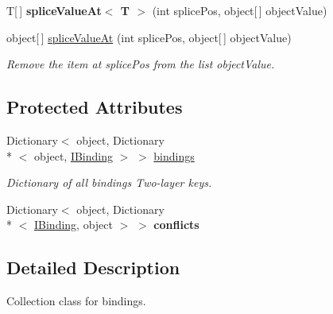 \begin{DoxyCompactItemize}
\item 
\hypertarget{classstrange_1_1framework_1_1impl_1_1_binder_a1550cafde3f21467d63dae64e1078fb0}{T\mbox{[}$\,$\mbox{]} {\bfseries splice\-Value\-At$<$ T $>$} (int splice\-Pos, object\mbox{[}$\,$\mbox{]} object\-Value)}\label{classstrange_1_1framework_1_1impl_1_1_binder_a1550cafde3f21467d63dae64e1078fb0}

\item 
\hypertarget{classstrange_1_1framework_1_1impl_1_1_binder_a349b12bdc879e7f465a7cf7dfeb3b5b4}{object\mbox{[}$\,$\mbox{]} \hyperlink{classstrange_1_1framework_1_1impl_1_1_binder_a349b12bdc879e7f465a7cf7dfeb3b5b4}{splice\-Value\-At} (int splice\-Pos, object\mbox{[}$\,$\mbox{]} object\-Value)}\label{classstrange_1_1framework_1_1impl_1_1_binder_a349b12bdc879e7f465a7cf7dfeb3b5b4}

\begin{DoxyCompactList}\small\item\em Remove the item at splice\-Pos from the list object\-Value. \end{DoxyCompactList}\end{DoxyCompactItemize}
\subsection*{Protected Attributes}
\begin{DoxyCompactItemize}
\item 
Dictionary$<$ object, Dictionary\\*
$<$ object, \hyperlink{interfacestrange_1_1framework_1_1api_1_1_i_binding}{I\-Binding} $>$ $>$ \hyperlink{classstrange_1_1framework_1_1impl_1_1_binder_a3b76e3cb4822c1f8732fd45fbd4d1802}{bindings}
\begin{DoxyCompactList}\small\item\em Dictionary of all bindings Two-\/layer keys. \end{DoxyCompactList}\item 
\hypertarget{classstrange_1_1framework_1_1impl_1_1_binder_a83af5663ac69ba271f18c03fdd9e21d2}{Dictionary$<$ object, Dictionary\\*
$<$ \hyperlink{interfacestrange_1_1framework_1_1api_1_1_i_binding}{I\-Binding}, object $>$ $>$ {\bfseries conflicts}}\label{classstrange_1_1framework_1_1impl_1_1_binder_a83af5663ac69ba271f18c03fdd9e21d2}

\end{DoxyCompactItemize}


\subsection{Detailed Description}
Collection class for bindings. 

